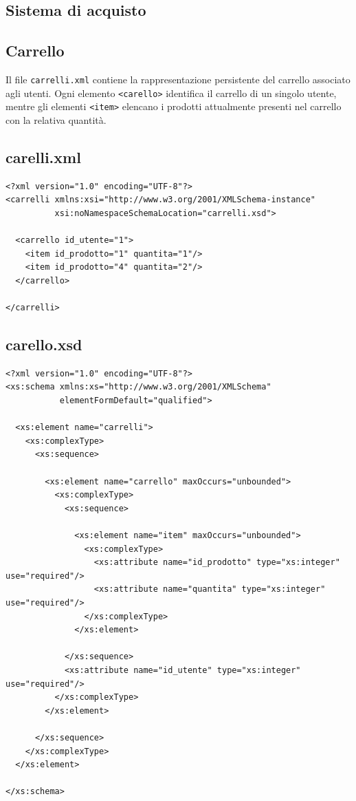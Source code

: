 \documentclass[a4paper,12pt]{report}
\begin{document}


\subsection{Sistema di acquisto}
\subsection*{Carrello}

Il file \texttt{carrelli.xml} contiene la rappresentazione persistente del carrello
associato agli utenti. Ogni elemento \texttt{<carello>} identifica il carrello di
un singolo utente, mentre gli elementi \texttt{<item>} elencano i prodotti
attualmente presenti nel carrello con la relativa quantità.

\subsection*{carelli.xml}
\begin{lstlisting}
<?xml version="1.0" encoding="UTF-8"?>
<carrelli xmlns:xsi="http://www.w3.org/2001/XMLSchema-instance"
          xsi:noNamespaceSchemaLocation="carrelli.xsd">

  <carrello id_utente="1">
    <item id_prodotto="1" quantita="1"/>
    <item id_prodotto="4" quantita="2"/>
  </carrello>

</carrelli>

\end{lstlisting}

\subsection*{carello.xsd}
\begin{lstlisting}
<?xml version="1.0" encoding="UTF-8"?>
<xs:schema xmlns:xs="http://www.w3.org/2001/XMLSchema"
           elementFormDefault="qualified">

  <xs:element name="carrelli">
    <xs:complexType>
      <xs:sequence>

        <xs:element name="carrello" maxOccurs="unbounded">
          <xs:complexType>
            <xs:sequence>

              <xs:element name="item" maxOccurs="unbounded">
                <xs:complexType>
                  <xs:attribute name="id_prodotto" type="xs:integer" use="required"/>
                  <xs:attribute name="quantita" type="xs:integer" use="required"/>
                </xs:complexType>
              </xs:element>

            </xs:sequence>
            <xs:attribute name="id_utente" type="xs:integer" use="required"/>
          </xs:complexType>
        </xs:element>

      </xs:sequence>
    </xs:complexType>
  </xs:element>

</xs:schema>

\end{lstlisting}
\end{document}
